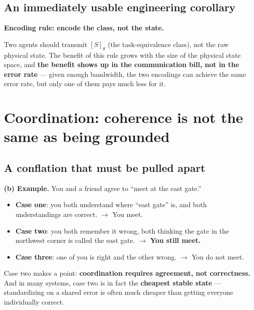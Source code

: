 \documentclass[11pt]{article}
\providecommand{\tightlist}{%
  \setlength{\itemsep}{0pt}\setlength{\parskip}{0pt}}
\renewenvironment{quote}
  {\def\FrameCommand{{\color{gray!60}\vrule width 2pt}\hspace{8pt}}%
   \MakeFramed{\advance\hsize-\width \FrameRestore}\begin{itshape}}
  {\end{itshape}\endMakeFramed}
\begin{document}
\hypertarget{an-immediately-usable-engineering-corollary}{%
\subsection{An immediately usable engineering corollary}\label{an-immediately-usable-engineering-corollary}}

\begin{quote}
\textbf{Encoding rule: encode the class, not the state.}
\end{quote}

Two agents should transmit \([S]_\theta\) (the task-equivalence class), not the raw physical state. The benefit of this rule grows with the size of the physical state space, and \textbf{the benefit shows up in the communication bill, not in the error rate} --- given enough bandwidth, the two encodings can achieve the same error rate, but only one of them pays much less for it.

\hypertarget{coordination-coherence-is-not-the-same-as-being-grounded}{%
\section{Coordination: coherence is not the same as being grounded}\label{coordination-coherence-is-not-the-same-as-being-grounded}}

\hypertarget{a-conflation-that-must-be-pulled-apart}{%
\subsection{A conflation that must be pulled apart}\label{a-conflation-that-must-be-pulled-apart}}

\textbf{(b) Example.} You and a friend agree to ``meet at the east gate.''

\begin{itemize}
\tightlist
\item
  \textbf{Case one}: you both understand where ``east gate'' is, and both understandings are correct. \(\rightarrow\) You meet.
\item
  \textbf{Case two}: you both remember it wrong, both thinking the gate in the northwest corner is called the east gate. \(\rightarrow\) \textbf{You still meet.}
\item
  \textbf{Case three}: one of you is right and the other wrong. \(\rightarrow\) You do not meet.
\end{itemize}

Case two makes a point: \textbf{coordination requires agreement, not correctness.} And in many systems, case two is in fact the \textbf{cheapest stable state} --- standardizing on a shared error is often much cheaper than getting everyone individually correct.
\end{document}
